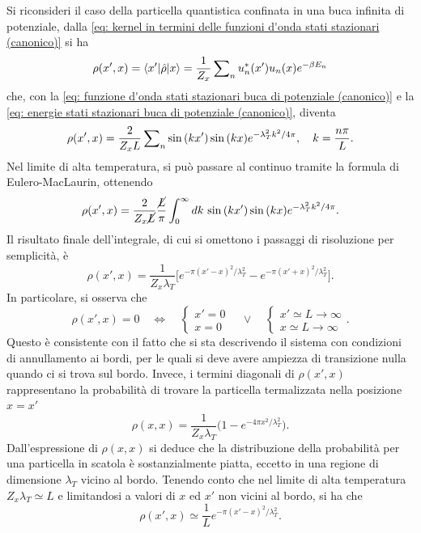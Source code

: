 Si riconsideri il caso della particella quantistica confinata in una buca infinita di potenziale, dalla \eqref{eq: kernel in termini delle funzioni d'onda stati stazionari (canonico)} si ha
\begin{equation}
    \rho(x',x) = \langle x' | \hat{\rho} | x \rangle = \frac{1}{Z_x}\sum\nolimits_nu_n^*(x')u_n(x)e^{-\beta E_n}
\end{equation}
che, con la \eqref{eq: funzione d'onda stati stazionari buca di potenziale (canonico)} e la \eqref{eq: energie stati stazionari buca di potenziale (canonico)}, diventa
\begin{equation}
\label{eq: matrice densità buca di potenziale (canonico)}
    \rho(x',x) = \frac{2}{Z_xL}\sum\nolimits_n\sin{(kx')}\sin{(kx)}e^{-\lambda_T^2k^2/4\pi},\quad k = \frac{n\pi}{L}.
\end{equation}
Nel limite di alta temperatura, si può passare al continuo tramite la formula di Eulero-MacLaurin, ottenendo
\begin{equation}
    \rho(x',x) = \frac{2}{Z_x\cancel{L}}\frac{\cancel{L}}{\pi}\int_0^\infty dk\,\sin{(kx')}\sin{(kx)}e^{-\lambda_T^2k^2/4\pi}.
\end{equation}
Il risultato finale dell'integrale, di cui si omettono i passaggi di risoluzione per semplicità, è
\begin{equation}
    \rho(x',x) = \frac{1}{Z_x\lambda_T}\bigg[e^{-\pi(x' - x)^2/\lambda_T^2} - e^{-\pi(x' + x)^2/\lambda_T^2} \bigg].
\end{equation}
In particolare, si osserva che
\begin{equation}
    \rho(x',x) = 0\quad\Longleftrightarrow\quad
    \begin{cases}
        x' = 0 \\
        x = 0
    \end{cases}\quad
    \vee\quad
    \begin{cases}
        x' \simeq L \to \infty \\
        x \simeq L \to \infty
    \end{cases}.
\end{equation}
Questo è consistente con il fatto che si sta descrivendo il sistema con condizioni di annullamento ai bordi, per le quali si deve avere ampiezza di transizione nulla quando ci si trova sul bordo. Invece, i termini diagonali di $\rho(x',x)$ rappresentano la probabilità di trovare la particella termalizzata nella posizione $x = x'$
\begin{equation}
    \rho(x,x) = \frac{1}{Z_x\lambda_T}\bigg(1 - e^{-4\pi x^2/\lambda_T^2}\bigg).
\end{equation}
Dall'espressione di $\rho(x,x)$ si deduce che la distribuzione della probabilità per una particella in scatola è sostanzialmente piatta, eccetto in una regione di dimensione $\lambda_T$ vicino al bordo. Tenendo conto che nel limite di alta temperatura $Z_x\lambda_T \simeq L$ e limitandosi a valori di $x$ ed $x'$ non vicini al bordo, si ha che
\begin{equation}
\label{eq: matrice densità buca di potenziale alta T (canonico)}
    \rho(x',x) \simeq \frac{1}{L}e^{-\pi(x' - x)^2/\lambda_T^2}.
\end{equation}

